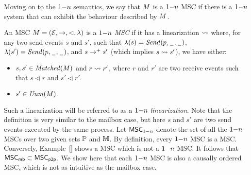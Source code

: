 \documentclass{article}
\begin{document}
\medskip

Moving on to the $1\mathsf{-}n$ semantics, we say that $M$ is a $1\mathsf{-}n$ MSC if there is a $1\mathsf{-}n$ system that can exhibit the behaviour described by $M$. 

\begin{definition}\label{def:one_n}
An MSC $M = (\mathcal{E},\to,\lhd,\lambda)$ is a \emph{$1\mathsf{-}n$ MSC} if it has a linearization $\rightsquigarrow$ where, for any two send events $s$ and $s'$, such that $\lambda(s)={\mathit{Send}(p,\hspace{0.1em}\underline{\hspace{0.5em}}\hspace{0.1em},\hspace{0.1em}\underline{\hspace{0.5em}}\hspace{0.1em})}$, $\lambda(s')={\mathit{Send}(p,\hspace{0.1em}\underline{\hspace{0.5em}}\hspace{0.1em},\hspace{0.1em}\underline{\hspace{0.5em}}\hspace{0.1em})}$, and $s \to^+ s'$ (which implies $s \rightsquigarrow s'$), we have either:
\begin{itemize}\itemsep=0.5ex
	\item $s,s' \in \mathit{Matched}(M)$ and $r \rightsquigarrow r'$, where $r$ and $r'$ are two receive events such that $s \lhd r$ and $s' \lhd r'$.
	\item $s' \in \mathit{Unm}(M)$.
\end{itemize}
\end{definition}

Such a linearization will be referred to as a \emph{$1\mathsf{-}n$ linearization}. Note that the definition is very similar to the mailbox case, but here $s$ and $s'$ are two send events executed by the same process. Let $\mathsf{MSC}_{1\mathsf{-}n}$ denote the set of all the $1\mathsf{-}n$ MSCs over two given sets $\mathbb{P}$ and $\mathbb{M}$. By definition, every $1\mathsf{-}n$ MSC is a \pp MSC. Conversely, Example~\ref{} shows a \pp MSC which is not a $1\mathsf{-}n$ MSC. It follows that $\mathsf{MSC}_{\mathsf{mb}} \subset \mathsf{MSC}_{\mathsf{p2p}}$. We show here that each $1\mathsf{-}n$ MSC is also a causally ordered MSC, which is not as intuitive as the mailbox case.

\end{document}
